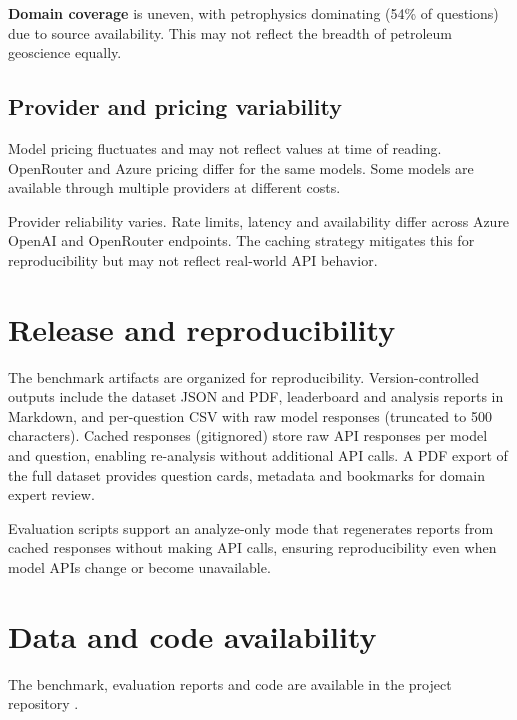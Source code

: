 \documentclass[11pt]{article}
\begin{document}
\textbf{Domain coverage} is uneven, with petrophysics dominating (54\% of questions) due to source availability. This may not reflect the breadth of petroleum geoscience equally.

\subsection{Provider and pricing variability}

Model pricing fluctuates and may not reflect values at time of reading. OpenRouter and Azure pricing differ for the same models. Some models are available through multiple providers at different costs.

Provider reliability varies. Rate limits, latency and availability differ across Azure OpenAI and OpenRouter endpoints. The caching strategy mitigates this for reproducibility but may not reflect real-world API behavior.


\section{Release and reproducibility}

The benchmark artifacts are organized for reproducibility. Version-controlled outputs include the dataset JSON and PDF, leaderboard and analysis reports in Markdown, and per-question CSV with raw model responses (truncated to 500 characters). Cached responses (gitignored) store raw API responses per model and question, enabling re-analysis without additional API calls. A PDF export of the full dataset provides question cards, metadata and bookmarks for domain expert review.

Evaluation scripts support an analyze-only mode that regenerates reports from cached responses without making API calls, ensuring reproducibility even when model APIs change or become unavailable.


\section{Data and code availability}
The benchmark, evaluation reports and code are available in the project repository \cite{formationeval_repo}.
\end{document}
